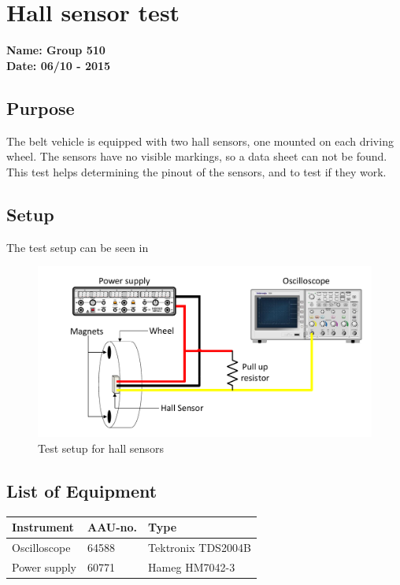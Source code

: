 \chapter{Hall sensor test} %
\textbf{Name: Group 510}\\
\textbf{Date: 06/10 - 2015}

\section*{Purpose}
The belt vehicle is equipped with two hall sensors, one mounted on each driving wheel. The sensors have no visible markings, so a data sheet can not be found. This test helps determining the pinout of the sensors, and to test if they work.
\\

\section*{Setup}
The test setup can be seen in 
\begin{figure}[H]
	\centering
	\includegraphics[scale=.6]{figures/hall-test-setup.pdf}
	\flushleft
	\caption{Test setup for hall sensors}
	\label{hallTest}
\end{figure}

\section*{List of Equipment}
\begin{table}[H]
\begin{tabular}{|l|l|p{4cm}|}
\hline%
  \textbf{Instrument}           &  \textbf{AAU-no.}  &  \textbf{Type}    \\
\hline%
  Oscilloscope                  &  64588             &  Tektronix TDS2004B  \\
\hline%
  Power supply							&  60771                  &   Hameg HM7042-3  \\
\hline%

\end{tabular}\\
\end{table}

